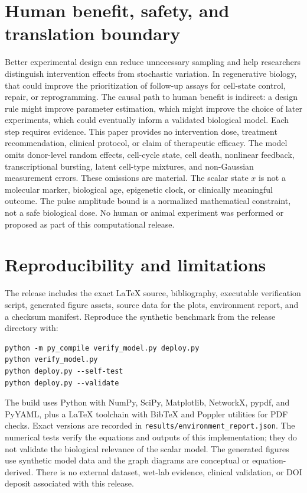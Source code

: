\documentclass[11pt,a4paper]{article}
\begin{document}
\section{Human benefit, safety, and translation boundary}
Better experimental design can reduce unnecessary sampling and help researchers distinguish intervention effects from stochastic variation. In regenerative biology, that could improve the prioritization of follow-up assays for cell-state control, repair, or reprogramming. The causal path to human benefit is indirect: a design rule might improve parameter estimation, which might improve the choice of later experiments, which could eventually inform a validated biological model. Each step requires evidence. This paper provides no intervention dose, treatment recommendation, clinical protocol, or claim of therapeutic efficacy.
The model omits donor-level random effects, cell-cycle state, cell death, nonlinear feedback, transcriptional bursting, latent cell-type mixtures, and non-Gaussian measurement errors. These omissions are material. The scalar state $x$ is not a molecular marker, biological age, epigenetic clock, or clinically meaningful outcome. The pulse amplitude bound is a normalized mathematical constraint, not a safe biological dose. No human or animal experiment was performed or proposed as part of this computational release.
\section{Reproducibility and limitations}
The release includes the exact LaTeX source, bibliography, executable verification script, generated figure assets, source data for the plots, environment report, and a checksum manifest. Reproduce the synthetic benchmark from the release directory with:
\begin{verbatim}
python -m py_compile verify_model.py deploy.py
python verify_model.py
python deploy.py --self-test
python deploy.py --validate
\end{verbatim}
The build uses Python with NumPy, SciPy, Matplotlib, NetworkX, pypdf, and PyYAML, plus a LaTeX toolchain with BibTeX and Poppler utilities for PDF checks. Exact versions are recorded in \texttt{results/environment_report.json}. The numerical tests verify the equations and outputs of this implementation; they do not validate the biological relevance of the scalar model. The generated figures use synthetic model data and the graph diagrams are conceptual or equation-derived. There is no external dataset, wet-lab evidence, clinical validation, or DOI deposit associated with this release.
\end{document}
